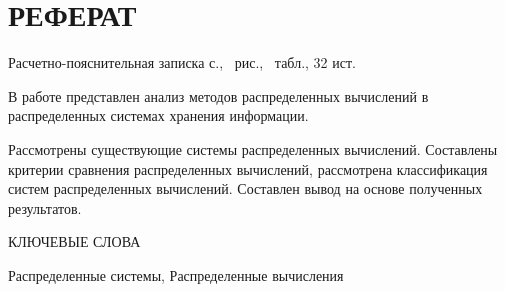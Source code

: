 \section*{РЕФЕРАТ}
Расчетно-пояснительная записка \pageref{LastPage} с., \totalfigures\ рис., \totaltables\ табл., 32 ист.

В работе представлен анализ методов распределенных вычислений в распределенных системах хранения информации.

Рассмотрены существующие системы распределенных вычислений. 
Составлены критерии сравнения распределенных вычислений, 
рассмотрена классификация систем распределенных вычислений.
Составлен вывод на основе полученных результатов.

КЛЮЧЕВЫЕ СЛОВА

Распределенные системы, Распределенные вычисления
